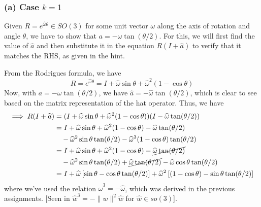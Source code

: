 \subsubsection*{(a) Case \( k=1 \)}

Given \( R = e^{\widehat{\omega} \theta} \in SO(3) \) for some unit vector \( \omega \) along the axis of rotation and angle \( \theta \), we have to show that \( a = -\omega \tan(\theta / 2) \).
For this, we will first find the value of \( \widehat{a} \) and then substitute it in the equation \( R(I + \widehat{a}) \) to verify that it matches the RHS, as given in the hint.

From the Rodrigues formula, we have
\begin{equation*}
    R = e^{\widehat{\omega} \theta} = I + \widehat{\omega} \sin \theta + \widehat{\omega}^{2} (1 - \cos \theta)
\end{equation*}
Now, with \( a = -\omega \tan(\theta / 2) \), we have \( \widehat{a} = -\widehat{\omega} \tan(\theta / 2) \), which is clear to see based on the matrix representation of the hat operator.
Thus, we have
\begin{align*}
    \implies
    R(I + \widehat{a})
     & =
    (I + \widehat{\omega} \sin \theta + \widehat{\omega}^{2} (1 - \cos \theta))(I - \widehat{\omega} \tan(\theta / 2))
    \\ & =
    I + \widehat{\omega} \sin \theta + \widehat{\omega}^{2} (1 - \cos \theta) - \widehat{\omega} \tan(\theta / 2)
    \\ & \quad
    - \widehat{\omega}^{2} \sin \theta \tan(\theta / 2) - \widehat{\omega}^{3} (1 - \cos \theta) \tan(\theta / 2)
    \\ & =
    I + \widehat{\omega} \sin \theta + \widehat{\omega}^{2} (1 - \cos \theta) - \cancel{\widehat{\omega} \tan(\theta / 2)}
    \\ & \quad
    - \widehat{\omega}^{2} \sin \theta \tan(\theta / 2) + \cancel{\widehat{\omega} \tan(\theta / 2)} - \widehat{\omega} \cos \theta \tan(\theta / 2)
    \\ & =
    I + \widehat{\omega} \left[ \sin \theta - \cos \theta \tan(\theta / 2) \right] + \widehat{\omega}^{2} \left[(1 - \cos \theta) - \sin \theta \tan(\theta / 2) \right]
\end{align*}
where we've used the relation \( \widehat{\omega}^{3} = -\widehat{\omega} \), which was derived in the previous assignments.
[Seen in \( \hat{w}^{3}=-\|w\|^{2} \hat{w} \) for \( \hat{w} \in so(3) \)].

